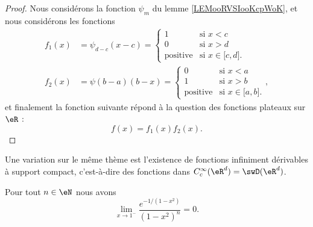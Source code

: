 \begin{proof}
	Nous considérons la fonction \( \psi_m\) du lemme \ref{LEMooRVSIooKcpWoK}, et nous considérons les fonctions
	\begin{subequations}
		\begin{align}
			f_1(x) & =\psi_{d-c}(x-c)=\begin{cases}
				                          1               & \text{si } x<c                               \\
				                          0               & \text{si } x>d                               \\
				                          \text{positive} & \text{si } x\in\mathopen[ c , d \mathclose].
			                          \end{cases} \\
			f_2(x) & =\psi(b-a)(b-x)=\begin{cases}
				                         0               & \text{si } x<a                                \\
				                         1               & \text{si } x>b                                \\
				                         \text{positive} & \text{si } x\in \mathopen[ a , b \mathclose].
			                         \end{cases},
		\end{align}
	\end{subequations}
	et finalement la fonction suivante répond à la question des fonctions plateaux sur \( \eR\) :
	\begin{equation}    \label{EqIHAFooXjfcll}
		f(x)=f_1(x)f_2(x).
	\end{equation}
\end{proof}

Une variation sur le même thème est l'existence de fonctions infiniment dérivables à support compact, c'est-à-dire des fonctions dans \(  C^{\infty}_c(\eR^d)=\swD(\eR^d)\).

\begin{lemma}        \label{LEMooLHIFooWpbauN}
	Pour tout \( n\in \eN\) nous avons
	\begin{equation}
		\lim_{x\to 1^-} \frac{   e^{-1/(1-x^2)}  }{ (1-x^2)^n }=0.
	\end{equation}
\end{lemma}

